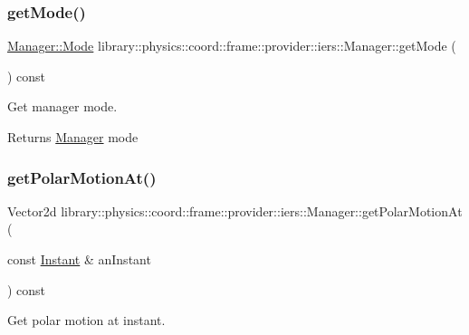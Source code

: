 \subsubsection{\texorpdfstring{get\+Mode()}{getMode()}}
{\footnotesize\ttfamily \hyperlink{classlibrary_1_1physics_1_1coord_1_1frame_1_1provider_1_1iers_1_1_manager_a84f44554ac04c5e18ed7ff448debf392}{Manager\+::\+Mode} library\+::physics\+::coord\+::frame\+::provider\+::iers\+::\+Manager\+::get\+Mode (\begin{DoxyParamCaption}{ }\end{DoxyParamCaption}) const}



Get manager mode. 

\begin{DoxyReturn}{Returns}
\hyperlink{classlibrary_1_1physics_1_1coord_1_1frame_1_1provider_1_1iers_1_1_manager}{Manager} mode 
\end{DoxyReturn}
\mbox{\label{classlibrary_1_1physics_1_1coord_1_1frame_1_1provider_1_1iers_1_1_manager_a3023a701ae8b2abf5a93e9c0c46db37a}} 
\subsubsection{\texorpdfstring{get\+Polar\+Motion\+At()}{getPolarMotionAt()}}
{\footnotesize\ttfamily Vector2d library\+::physics\+::coord\+::frame\+::provider\+::iers\+::\+Manager\+::get\+Polar\+Motion\+At (\begin{DoxyParamCaption}\item[{const \hyperlink{classlibrary_1_1physics_1_1time_1_1_instant}{Instant} \&}]{an\+Instant }\end{DoxyParamCaption}) const}



Get polar motion at instant. 


